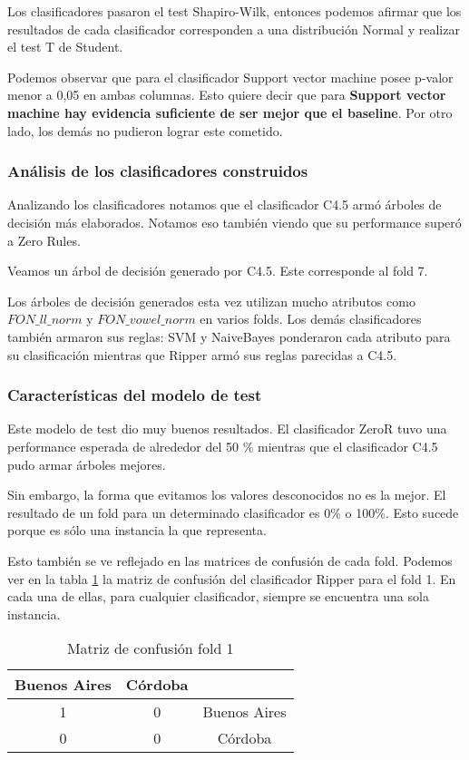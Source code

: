 Los clasificadores pasaron el test Shapiro-Wilk, entonces podemos afirmar que los resultados de cada clasificador corresponden a una distribución Normal y realizar el test T de Student.

Podemos observar que para el clasificador Support vector machine posee p-valor menor a 0,05 en ambas columnas. Esto quiere decir que para \textbf{Support vector machine hay evidencia suficiente de ser mejor que el baseline}. Por otro lado, los demás no pudieron lograr este cometido. 

\subsubsection{Análisis de los clasificadores construidos}

Analizando los clasificadores notamos que el clasificador C4.5 armó árboles de decisión más elaborados. Notamos eso también viendo que su performance superó a Zero Rules. 

Veamos un árbol de decisión generado por C4.5. Este corresponde al fold 7. 

Los árboles de decisión generados esta vez utilizan mucho  atributos como $FON\_ll\_norm$ y $FON\_vowel\_norm$ en varios folds. Los demás clasificadores también armaron sus reglas: SVM y NaiveBayes ponderaron cada atributo para su clasificación mientras que Ripper armó sus reglas parecidas a C4.5. 

\subsubsection{Características del modelo de test}

Este modelo de test dio muy buenos resultados. El clasificador ZeroR tuvo una performance esperada de alrededor del 50 \% mientras que el clasificador C4.5 pudo armar árboles mejores. 

Sin embargo, la forma que evitamos los valores desconocidos no es la mejor. El resultado de un fold para un determinado clasificador es 0\% o 100\%. Esto sucede porque es sólo una instancia la que representa. 

Esto también se ve reflejado en las matrices de confusión de cada fold. Podemos ver en la tabla \ref{PAH_mat_conf_f1_solo0o1} la matriz de confusión del clasificador Ripper para el fold 1. En cada una de ellas, para cualquier clasificador, siempre se encuentra una sola instancia. 

\begin{table}[H]
	\centering
	\begin{tabular}{|c|c|c|}
		\hline
		Buenos Aires & Córdoba & \\ \hline
		1 & 0 & Buenos Aires\\ \hline
		0 & 0 & Córdoba\\ \hline
	\end{tabular}
	\caption{Matriz de confusión fold 1}
	\label{PAH_mat_conf_f1_solo0o1}
\end{table}
